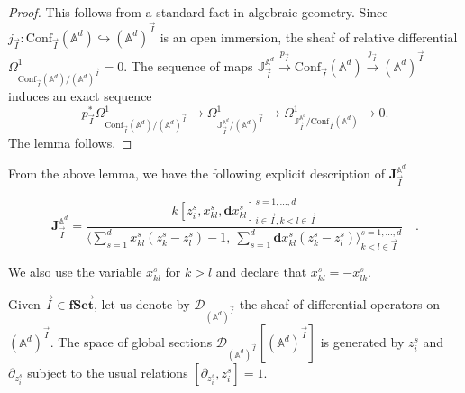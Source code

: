 \documentclass[11pt]{amsart}
\theoremstyle{definition}
\theoremstyle{remark}
\numberwithin{equation}{section}
\begin{document}
\begin{proof}
This follows from a standard fact in algebraic geometry. Since $j_{\vec{I}}: \mathrm{Conf}_{\vec{I}}(\mathbb{A}^d)\hookrightarrow (\mathbb{A}^d)^{\vec{I}}$ is an open immersion, the sheaf of relative differential $\Omega^1_{\mathrm{Conf}_{\vec{I}}(\mathbb{A}^d)/(\mathbb{A}^d)^{\vec{I}}}=0$. The sequence of maps $\mathbb{J}^{\mathbb{A}^d}_{\vec{I}}\xrightarrow{p_{\vec{I}}}\mathrm{Conf}_{\vec{I}}(\mathbb{A}^d)\xrightarrow{j_{\vec{I}}}(\mathbb{A}^d)^{\vec{I}}$ induces an exact sequence
$$
p^*_{\vec{I}}\Omega^1_{\mathrm{Conf}_{\vec{I}}(\mathbb{A}^d)/(\mathbb{A}^d)^{\vec{I}}}\rightarrow\Omega^{1}_{\mathbb{J}^{\mathbb{A}^d}_{\vec{I}}/(\mathbb{A}^d)^{\vec{I}}}\rightarrow  \Omega^{1}_{\mathbb{J}^{\mathbb{A}^d}_{\vec{I}}/\mathrm{Conf}_{\vec{I}}(\mathbb{A}^d)}\rightarrow 0.
$$
The lemma follows.

\end{proof}

From the above lemma, we have the following explicit description of $\mathbf{J}^{\mathbb{A}^d}_{\vec{I}}$

$$
\mathbf{J}^{\mathbb{A}^d}_{\vec{I}}=\frac{k[z^s_i,x^s_{kl},\mathbf{d}x^s_{kl}]^{s=1,\dots,d}_{i\in \vec{I},k<l\in \vec{I}}}{\langle \sum\limits_{s=1}^dx^s_{kl}(z^s_k-z^s_l)-1,\ \sum\limits_{s=1}^d\mathbf{d}x^s_{kl}(z^s_k-z^s_l) \rangle^{s=1,\dots,d}_{k<l\in \vec{I}}}\quad .
$$

We also use the variable $x^s_{kl}$ for $k>l$ and declare that $x^s_{kl}=-x^s_{lk}$.


Given $\vec{I}\in \overrightarrow{\mathbf{fSet}}$, let us denote by $\mathcal{D}_{(\mathbb{A}^d)^{\vec{I}}}$ the sheaf of differential operators on $(\mathbb{A}^d)^{\vec{I}}$. The space of global sections $\mathcal{D}_{(\mathbb{A}^d)^{\vec{I}}}[(\mathbb{A}^d)^{\vec{I}}]$ is generated by $z^s_{i}$ and $ \partial_{z^s_{i}}$ subject to the usual relations $[\partial_{z^s_{i}},z^s_{i}]=1$.
\end{document}
